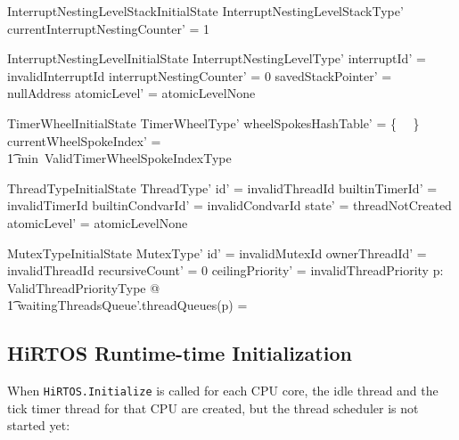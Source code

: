 \documentclass{AUJarticle}
\begin{document}
\begin{schema}{InterruptNestingLevelStackInitialState}
   InterruptNestingLevelStackType'
\where
   currentInterruptNestingCounter' = 1 \\
\end{schema}

\begin{schema}{InterruptNestingLevelInitialState}
   InterruptNestingLevelType'
\where
   interruptId' = invalidInterruptId
\also
   interruptNestingCounter' = 0
\also
   savedStackPointer' = nullAddress
\also
   atomicLevel' = atomicLevelNone
\end{schema}

\begin{schema}{TimerWheelInitialState}
   TimerWheelType'
\where
   \ran wheelSpokesHashTable' = \{~ \emptyset ~\}
\also
   currentWheelSpokeIndex' = \\
   \t1 min~ValidTimerWheelSpokeIndexType
\end{schema}


\begin{schema}{ThreadTypeInitialState}
   ThreadType'
\where
   id' = invalidThreadId
\also
   builtinTimerId' = invalidTimerId
\also
   builtinCondvarId' = invalidCondvarId
\also
   state' = threadNotCreated
\also
   atomicLevel' = atomicLevelNone
\end{schema}


\begin{schema}{MutexTypeInitialState}
   MutexType'
\where
  id' = invalidMutexId
\also
  ownerThreadId' = invalidThreadId
\also
  recursiveCount' = 0
\also
  ceilingPriority' = invalidThreadPriority
\also
   \forall p: ValidThreadPriorityType @ \\
\t1      waitingThreadsQueue'.threadQueues(p) = \emptyset
\end{schema}

\subsection{HiRTOS Runtime-time Initialization}
When \verb`HiRTOS.Initialize` is called for each CPU core, the idle thread
and the tick timer thread for that CPU are created, but the thread
scheduler is not started yet:
\end{document}
